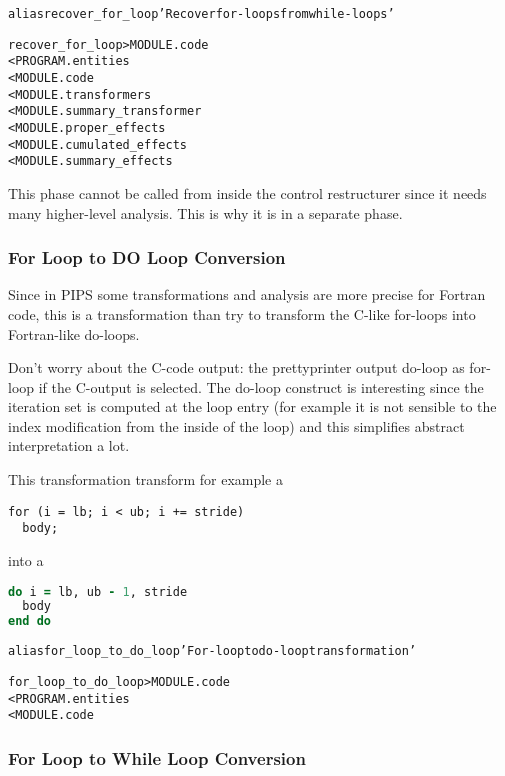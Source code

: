 \documentclass[a4paper]{report}
\newenvironment{PipsMake}{\begin{alltt}}{\end{alltt}}
\newenvironment{PipsPass}[1]{\label{pass:#1}}{}
\begin{document}
\begin{PipsMake}
alias recover_for_loop 'Recover for-loops from while-loops'

recover_for_loop          > MODULE.code
        < PROGRAM.entities
        < MODULE.code
        < MODULE.transformers
        < MODULE.summary_transformer
        < MODULE.proper_effects
        < MODULE.cumulated_effects
        < MODULE.summary_effects
\end{PipsMake}

This phase cannot be called from inside the control restructurer since it
needs many higher-level analysis. This is why it is in a separate phase.

\subsubsection{For Loop to DO Loop Conversion}
\label{sec:loop-do-loop}

\begin{PipsPass}{for_loop_to_do_loop}
Since in PIPS some transformations and analysis are more precise for
Fortran code, this is a transformation than try to transform the C-like
for-loops into Fortran-like do-loops.
\end{PipsPass}

Don't worry about the C-code output:
the prettyprinter output do-loop as for-loop if the C-output is selected.
The do-loop construct is interesting since the iteration set is computed
at the loop entry (for example it is not sensible to the index
modification from the inside of the loop) and this simplifies abstract
interpretation a lot.

This transformation transform for example a
\begin{lstlisting}
for (i = lb; i < ub; i += stride)
  body;
\end{lstlisting}
into a
\begin{lstlisting}[language=fortran]
do i = lb, ub - 1, stride
  body
end do
\end{lstlisting}

\begin{PipsMake}
alias for_loop_to_do_loop 'For-loop to do-loop transformation'

for_loop_to_do_loop          > MODULE.code
        < PROGRAM.entities
        < MODULE.code
\end{PipsMake}


\subsubsection{For Loop to While Loop Conversion}
\label{sec:loop-while-loop}
\end{document}
